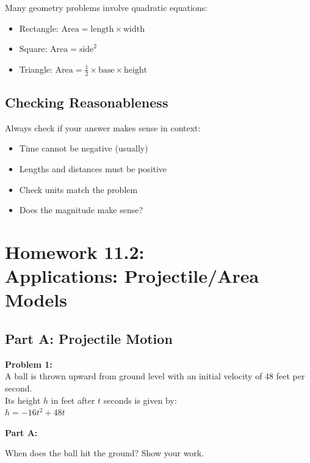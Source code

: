 \documentclass[12pt]{article}
\begin{document}
			Many geometry problems involve quadratic equations:
			\begin{itemize}
				\item Rectangle: $\text{Area} = \text{length} \times \text{width}$
				\item Square: $\text{Area} = \text{side}^2$
				\item Triangle: $\text{Area} = \frac{1}{2} \times \text{base} \times \text{height}$
			\end{itemize}

		\subsection*{Checking Reasonableness}

			Always check if your answer makes sense in context:
			\begin{itemize}
				\item Time cannot be negative (usually)
				\item Lengths and distances must be positive
				\item Check units match the problem
				\item Does the magnitude make sense?
			\end{itemize}

		\newpage

	\section*{Homework 11.2: \\ Applications: Projectile/Area Models}

		\subsection*{Part A: Projectile Motion}

			\textbf{Problem 1:}\\

			A ball is thrown upward from ground level with an initial velocity of 48 feet per second.\\

			Its height $h$ in feet after $t$ seconds is given by:\\

			$h = -16t^2 + 48t$

			\vspace{0.5cm}

			\textbf{Part A:}
            
            When does the ball hit the ground? Show your work.
\end{document}
